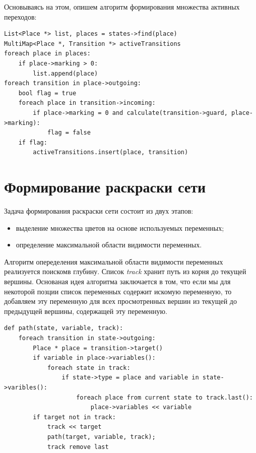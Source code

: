 Основываясь на этом, опишем алгоритм формирования множества активных переходов:
\begin{lstlisting}[style=pseudocode,caption={Алгоритм формирования множества активных переходов}]
List<Place *> list, places = states->find(place)
MultiMap<Place *, Transition *> activeTransitions
foreach place in places:
	if place->marking > 0:
		list.append(place)
foreach transition in place->outgoing:
	bool flag = true
	foreach place in transition->incoming:
		if place->marking = 0 and calculate(transition->guard, place->marking):
			flag = false	
	if flag:
		activeTransitions.insert(place, transition)
\end{lstlisting}

\section{Формирование раскраски сети}

Задача формирования раскраски сети состоит из двух этапов:
\begin{itemize}
\item выделение множества цветов на основе используемых переменных;
\item определение максимальной области видимости переменных.
\end{itemize}

Алгоритм опеределения максимальной области видимости переменных реализуется поискомв глубину. Список \textit{track} хранит путь из корня до текущей вершины. Основаная идея алгоритма заключается в том, что если мы для некоторой позции список переменных содержит искомую переменную, то добавляем эту переменную для всех просмотренных вершин из текущей до предыдущей вершины, содержащей эту переменную.

\begin{lstlisting}[style=pseudocode,caption={Алгоритм опеределения максимальной области видимости переменных}]
def path(state, variable, track):
    foreach transition in state->outgoing:
        Place * place = transition->target()
        if variable in place->variables():
            foreach state in track:
                if state->type = place and variable in state->varibles():
                    foreach place from current state to track.last():
                        place->variables << variable
        if target not in track:
            track << target
            path(target, variable, track);
            track remove last
\end{lstlisting}

